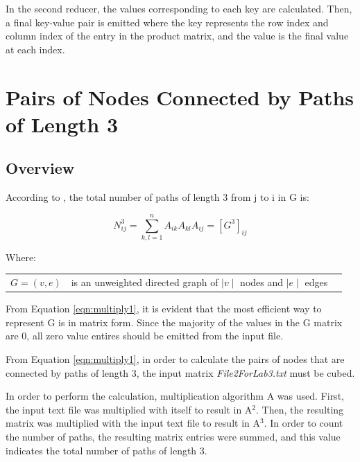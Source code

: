 \documentclass[10pt,twocolumn]{witseiepaper}
\begin{document}
In the second reducer, the values corresponding to each key are calculated. Then, a final key-value pair is emitted where the key represents the row index and column index of the entry in the product matrix, and the value is the final value at each index.

\section{Pairs of Nodes Connected by Paths of Length 3}
\subsection{Overview}
According to \cite{pathLength3}, the total number of paths of length 3 from j to i in G is:

 \begin{equation}
N_{ij}^{3} = \sum _{k,l = 1}^{n} A_{ik}A_{kl}A_{ij} = [G^{3}]_{ij}
\label{eqn:multiply1}
\end{equation}

Where:
\begin{tabular}{lll}
	$G = (v,e)$           &  is an unweighted directed graph of $\mid v \mid$ nodes and $\mid e \mid$ edges \\
\end{tabular}

From Equation \ref{eqn:multiply1}, it is evident that the most efficient way to represent G is in matrix form. Since the majority of the values in the G matrix are 0, all zero value entires should be emitted from the input file.

From Equation \ref{eqn:multiply1}, in order to calculate the pairs of nodes that are connected by paths of length 3, the input matrix \textit{File2ForLab3.txt} must be cubed.

In order to perform the calculation, multiplication algorithm A was used. First, the input text file was multiplied with itself to result in A$^{2}$. Then, the resulting matrix was multiplied with the input text file to result in A$^{3}$. In order to count the number of paths, the resulting matrix entries were summed, and this value indicates the total number of paths of length 3.
\end{document}
